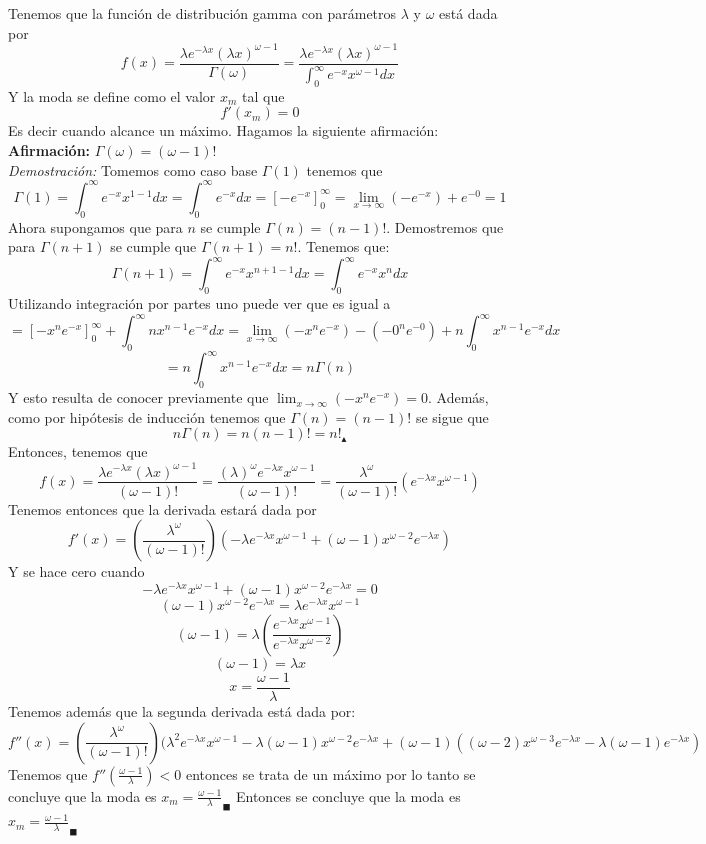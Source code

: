 \documentclass[11pt,a4paper]{report}
\begin{document}
\begin{enumerate}
{\begin{enumerate}
{				Tenemos que la función de distribución gamma con parámetros $\lambda$ y $\omega$ está dada por
				$$f(x)=\frac{\lambda e^{-\lambda x}(\lambda x)^{\omega-1}}{\Gamma(\omega)}=\frac{\lambda e^{-\lambda x}(\lambda x)^{\omega -1}}{\int_{0}^{\infty}e^{-x}x^{\omega -1}dx}$$ Y la moda se define como el valor $x_{m}$ tal que $$f'(x_{m})=0$$
				Es decir cuando alcance un máximo. Hagamos la siguiente afirmación:\\
				\textbf{Afirmación:} $\Gamma(\omega)=(\omega-1)!$ \\
				\textit{Demostración:} Tomemos como caso base $\Gamma(1)$ tenemos que $$\Gamma(1)=\int_{0}^{\infty}e^{-x}x^{1-1}dx=\int_{0}^{\infty}e^{-x}dx=[-e^{-x}]_{0}^{\infty}=\lim_{x\rightarrow \infty}(-e^{-x})+e^{-0}=1$$
				Ahora supongamos que para $n$ se cumple $\Gamma(n)=(n-1)!$. Demostremos que para $\Gamma(n+1)$ se cumple que $\Gamma(n+1)=n!$. Tenemos que: $$\Gamma(n+1)=\int_{0}^{\infty}e^{-x}x^{n+1-1}dx=\int_{0}^{\infty}e^{-x}x^{n}dx$$ Utilizando integración por partes uno puede ver que es igual a $$=[-x^{n}e^{-x}]_{0}^{\infty}+\int_{0}^{\infty}n  x^{n-1}e^{-x}dx=\lim_{x\rightarrow \infty}(-x^n e^{-x})-(-0^{n} e^{-0})+n\int_{0}^{\infty}x^{n-1}e^{-x}dx$$ $$=n\int_{0}^{\infty}x^{n-1}e^{-x}dx=n\Gamma(n)$$
				Y esto resulta de conocer previamente que $\lim_{x \rightarrow \infty}(-x^{n}e^{-x})=0$. Además, como por hipótesis de inducción tenemos que $\Gamma(n)=(n-1)!$ se sigue que $$n\Gamma(n)=n(n-1)!=n!_{\blacktriangle}$$ Entonces, tenemos que $$f(x)=\frac{\lambda e^{-\lambda x}(\lambda x)^{\omega-1}}{(\omega-1)!}=\frac{(\lambda)^{\omega}e^{-\lambda x}x^{\omega-1}}{(\omega-1)!}=\frac{\lambda^{\omega}}{(\omega-1)!}(e^{-\lambda x}x^{\omega-1})$$ Tenemos entonces que la derivada estará dada por $$f'(x)=(\frac{\lambda^{\omega}}{(\omega-1)!}) (-\lambda e^{-\lambda x}x^{\omega-1}+(\omega-1)x^{\omega-2}e^{-\lambda x})$$ Y se hace cero cuando $$ -\lambda e^{-\lambda x}x^{\omega-1}+(\omega-1)x^{\omega-2}e^{-\lambda x}=0$$ $$(\omega-1)x^{\omega-2} e^{-\lambda x}=\lambda e^{-\lambda x}x^{\omega-1}$$ $$(\omega-1)=\lambda (\frac{e^{-\lambda x} x^{\omega-1}}{e^{-\lambda x}x^{\omega-2}})$$ $$(\omega-1)=\lambda x$$ $$x=\frac{\omega-1}{\lambda}$$
	Tenemos además que la segunda derivada está dada por:
				$$f''(x)=(\frac{\lambda^{\omega}}{(\omega-1)!})(\lambda^2 e^{-\lambda x}x^{\omega-1}-\lambda(\omega-1)x^{\omega-2}e^{-\lambda x}+(\omega-1)((\omega-2)x^{\omega-3}e^{-\lambda x}-\lambda(\omega-1)e^{-\lambda x})$$
				Tenemos que $f''(\frac{\omega-1}{\lambda})<0$ entonces se trata de un máximo por lo tanto se concluye que la moda es $x_{m}=\frac{\omega-1}{\lambda}_{\blacksquare}$
				Entonces se concluye que la moda es $x_{m}=\frac{\omega-1}{\lambda}_{\blacksquare}$
				}


\end{enumerate}}
\end{enumerate}
\end{document}
